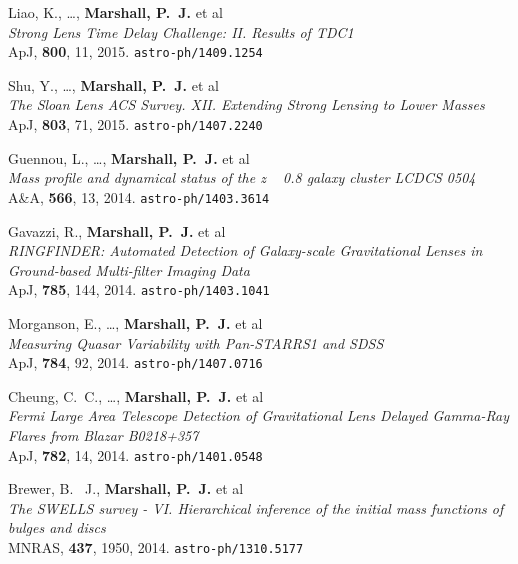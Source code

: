\begin{revnumerate}
\item{Liao, K., \ldots, \textbf{Marshall, P.~J.} et al\\
\textit{Strong Lens Time Delay Challenge: II. Results of TDC1}\\
ApJ, \textbf{800}, 11, 2015.
\texttt{astro-ph/1409.1254}
}

\item{Shu, Y., \ldots, \textbf{Marshall, P.~J.} et al\\
\textit{The Sloan Lens ACS Survey. XII. Extending Strong Lensing to Lower Masses}\\
ApJ, \textbf{803}, 71, 2015.
\texttt{astro-ph/1407.2240}
}

\item{Guennou, L., \ldots, \textbf{Marshall, P.~J.} et al\\
\textit{Mass profile and dynamical status of the z ~ 0.8 galaxy cluster LCDCS 0504}\\
A\&A, \textbf{566}, 13, 2014.
\texttt{astro-ph/1403.3614}
}

\item{Gavazzi, R., \textbf{Marshall, P.~J.} et al\\
\textit{RINGFINDER: Automated Detection of Galaxy-scale Gravitational Lenses in Ground-based Multi-filter Imaging Data}\\
ApJ, \textbf{785}, 144, 2014.
\texttt{astro-ph/1403.1041}
}

\item{Morganson, E., \ldots, \textbf{Marshall, P.~J.} et al\\
\textit{Measuring Quasar Variability with Pan-STARRS1 and SDSS}\\
ApJ, \textbf{784}, 92, 2014.
\texttt{astro-ph/1407.0716}
}

\item{{Cheung}, C.~C., \ldots, \textbf{Marshall, P.~J.} et al\\
\textit{Fermi Large Area Telescope Detection of Gravitational Lens Delayed Gamma-Ray Flares from Blazar B0218+357}\\
ApJ, \textbf{782}, 14, 2014.
\texttt{astro-ph/1401.0548}
}

\item{{Brewer}, B.~ J., \textbf{Marshall, P.~J.} et al\\
\textit{The SWELLS survey - VI. Hierarchical inference of the initial mass functions of bulges and discs}\\
MNRAS, \textbf{437}, 1950, 2014.
\texttt{astro-ph/1310.5177}
}


\end{revnumerate}
